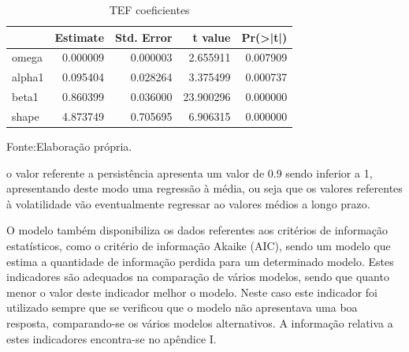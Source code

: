 \documentclass[
  12pt,
  a4paper,
  openany]{book}
\newenvironment{Shaded}{\begin{snugshade}}{\end{snugshade}}
\newcommand{\CommentTok}[1]{\textcolor[rgb]{0.56,0.35,0.01}{\textit{#1}}}
\newcommand{\DataTypeTok}[1]{\textcolor[rgb]{0.13,0.29,0.53}{#1}}
\newcommand{\DecValTok}[1]{\textcolor[rgb]{0.00,0.00,0.81}{#1}}
\newcommand{\KeywordTok}[1]{\textcolor[rgb]{0.13,0.29,0.53}{\textbf{#1}}}
\newcommand{\NormalTok}[1]{#1}
\newcommand{\OperatorTok}[1]{\textcolor[rgb]{0.81,0.36,0.00}{\textbf{#1}}}
\newcommand{\OtherTok}[1]{\textcolor[rgb]{0.56,0.35,0.01}{#1}}
\newcommand{\StringTok}[1]{\textcolor[rgb]{0.31,0.60,0.02}{#1}}
\begin{document}
\scriptsize

\begin{Shaded}
\end{Shaded}

\normalsize

\begin{table}[!h]

\caption{\label{tab:tefcoefgarch}TEF coeficientes}
\centering
\begin{tabular}[t]{lrrrr}
\toprule
  &  Estimate &  Std. Error &  t value & Pr(>|t|)\\
\midrule
omega & 0.000009 & 0.000003 & 2.655911 & 0.007909\\
alpha1 & 0.095404 & 0.028264 & 3.375499 & 0.000737\\
beta1 & 0.860399 & 0.036000 & 23.900296 & 0.000000\\
shape & 4.873749 & 0.705695 & 6.906315 & 0.000000\\
\bottomrule
\end{tabular}
\end{table}
\FloatBarrier
\centering

Fonte:Elaboração própria.

\justifying
\bigskip

o valor referente a persistência apresenta um valor de 0.9 sendo inferior a 1, apresentando deste modo uma regressão à média, ou seja que os valores referentes à volatilidade vão eventualmente regressar ao valores médios a longo prazo.

O modelo também disponibiliza os dados referentes aos critérios de informação estatísticos, como o critério de informação Akaike (AIC), sendo um modelo que estima a quantidade de informação perdida para um determinado modelo. Estes indicadores são adequados na comparação de vários modelos, sendo que quanto menor o valor deste indicador melhor o modelo. Neste caso este indicador foi utilizado sempre que se verificou que o modelo não apresentava uma boa resposta, comparando-se os vários modelos alternativos. A informação relativa a estes indicadores encontra-se no apêndice I.
\end{document}
